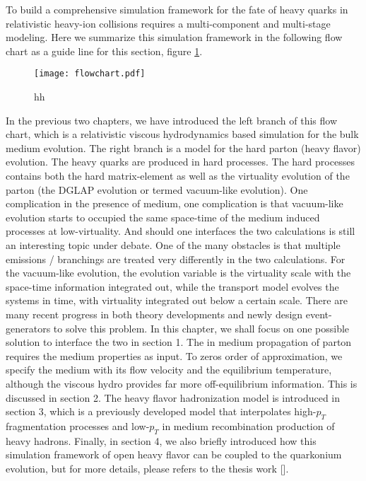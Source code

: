 To build a comprehensive simulation framework for the fate of heavy quarks in relativistic heavy-ion collisions requires a multi-component and multi-stage modeling.
Here we summarize this simulation framework in the following flow chart as a guide line for this section, figure \ref{fig:flowchart}.

\begin{figure}
\centering
\texttt{[image: flowchart.pdf]}
\caption{hh}
\label{fig:flowchart}
\end{figure}

In the previous two chapters, we have introduced the left branch of this flow chart, which is a relativistic viscous hydrodynamics based simulation for the bulk medium evolution.
The right branch is a model for the hard parton (heavy flavor) evolution.
The heavy quarks are produced in hard processes.
The hard processes contains both the hard matrix-element as well as the virtuality evolution of the parton (the DGLAP evolution or termed vacuum-like evolution).
One complication in the presence of medium, one complication is that vacuum-like evolution starts to occupied the same space-time of the medium induced processes at low-virtuality.
And should one interfaces the two calculations is still an interesting topic under debate.
One of the many obstacles is that multiple emissions / branchings are treated very differently in the two calculations.
For the vacuum-like evolution, the evolution variable is the virtuality scale with the space-time information integrated out, while the transport model evolves the systems in time, with virtuality integrated out below a certain scale.
There are many recent progress in both theory developments and newly design event-generators to solve this problem.
In this chapter, we shall focus on one possible solution to interface the two in section 1.
The in medium propagation of parton requires the medium properties as input. 
To zeros order of approximation, we specify the medium with its flow velocity and the equilibrium temperature, although the viscous hydro provides far more off-equilibrium information. 
This is discussed in section 2.
The heavy flavor hadronization model is introduced in section 3, which is a previously developed model that interpolates high-$p_T$ fragmentation processes and low-$p_T$ in medium recombination production of heavy hadrons.
Finally, in section 4, we also briefly introduced how this simulation framework of open heavy flavor can be coupled to the quarkonium evolution, but for more details, please refers to the thesis work [].



